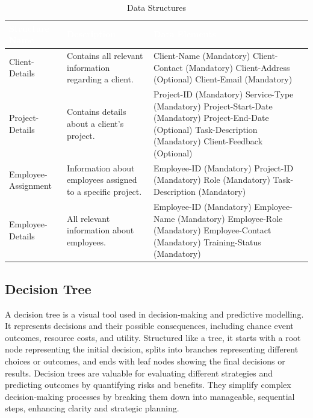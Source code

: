 \documentclass[12pt,a4paper]{article}
\begin{document}
\begin{table}[H]
\centering
\begin{tabular}{|p{3.8cm}|p{5cm}|p{6.5cm}|}
\hline
\rowcolor{headercolor}
\textcolor{white}{\textbf{Structure Name}} & \textcolor{white}{\textbf{Description}} & \textcolor{white}{\textbf{Data Elements}} \\
\hline
Client-Details & Contains all relevant information regarding a client. &
Client-Name (Mandatory) \newline
Client-Contact (Mandatory) \newline
Client-Address (Optional) \newline
Client-Email (Mandatory) \\
\hline
Project-Details & Contains details about a client’s project. &
Project-ID (Mandatory) \newline
Service-Type (Mandatory) \newline
Project-Start-Date (Mandatory) \newline
Project-End-Date (Optional) \newline
Task-Description (Mandatory) \newline
Client-Feedback (Optional) \\
\hline
Employee-Assignment & Information about employees assigned to a specific project. &
Employee-ID (Mandatory) \newline
Project-ID (Mandatory) \newline
Role (Mandatory) \newline
Task-Description (Mandatory) \\
\hline
Employee-Details & All relevant information about employees. &
Employee-ID (Mandatory) \newline
Employee-Name (Mandatory) \newline
Employee-Role (Mandatory) \newline
Employee-Contact (Mandatory) \newline
Training-Status (Mandatory) \\
\hline
\end{tabular}
\caption{Data Structures}
\end{table}





\subsection{Decision Tree}
A decision tree is a visual tool used in decision‑making and predictive modelling.  It represents decisions and their possible consequences, including chance event outcomes, resource costs, and utility.  Structured like a tree, it starts with a root node representing the initial decision, splits into branches representing different choices or outcomes, and ends with leaf nodes showing the final decisions or results.  Decision trees are valuable for evaluating different strategies and predicting outcomes by quantifying risks and benefits.  They simplify complex decision‑making processes by breaking them down into manageable, sequential steps, enhancing clarity and strategic planning.
\end{document}
